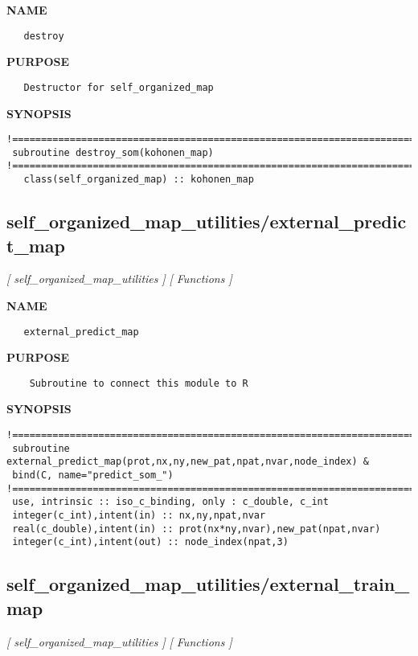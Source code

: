 \documentclass{article}
\begin{document}
\label{ch:robo41}
\label{ch:self_organized_map_utilities_destroy}
\textbf{NAME}
\begin{verbatim}
   destroy
\end{verbatim}
\textbf{PURPOSE}
\begin{verbatim}
   Destructor for self_organized_map 
\end{verbatim}
\textbf{SYNOPSIS}
\begin{verbatim}
!========================================================================================
 subroutine destroy_som(kohonen_map)
!========================================================================================
   class(self_organized_map) :: kohonen_map
\end{verbatim}
\newpage
\subsection{self\_organized\_map\_utilities/external\_predict\_map}
\textsl{[ self\_organized\_map\_utilities ]}
\textsl{[ Functions ]}

\label{ch:robo42}
\label{ch:self_organized_map_utilities_external_predict_map}
\textbf{NAME}
\begin{verbatim}
   external_predict_map
\end{verbatim}
\textbf{PURPOSE}
\begin{verbatim}
    Subroutine to connect this module to R
\end{verbatim}
\textbf{SYNOPSIS}
\begin{verbatim}
!========================================================================================
 subroutine external_predict_map(prot,nx,ny,new_pat,npat,nvar,node_index) & 
 bind(C, name="predict_som_")
!========================================================================================
 use, intrinsic :: iso_c_binding, only : c_double, c_int
 integer(c_int),intent(in) :: nx,ny,npat,nvar
 real(c_double),intent(in) :: prot(nx*ny,nvar),new_pat(npat,nvar)
 integer(c_int),intent(out) :: node_index(npat,3) 
\end{verbatim}
\newpage
\subsection{self\_organized\_map\_utilities/external\_train\_map}
\textsl{[ self\_organized\_map\_utilities ]}
\textsl{[ Functions ]}
\end{document}
